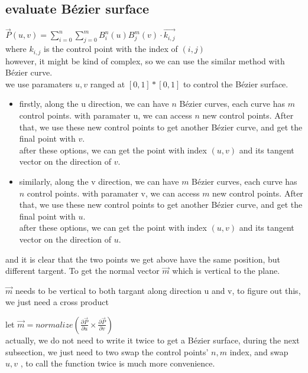 \documentclass[acmtog]{acmart}
\begin{document}
\subsection{evaluate Bézier surface}
$\vec{P}(u,v)=\sum_{i=0}^n\sum_{j=0}^mB_i^n(u)B_j^m(v)\cdot\vec{k_{i,j}}$\\
where $k_{i,j}$ is the control point with the index of $(i,j)$\\
however, it might be kind of complex, so we can use the similar method with Bézier curve.\\
we use paramaters $u,v$ ranged at $[0,1]*[0,1]$ to control the Bézier surface.\\
\begin{itemize}
\item firstly, along the u direction, we can have $n$ Bézier curves, each curve has $m$ control points.
with paramater u, we can access $n$ new control points.
After that, we use these new control points to get another Bézier curve, and get the 
final point with $v$.\\
after these options, we can get the point with index $(u,v)$ and its tangent vector on the direction of $v$.\\

\item similarly, along the v direction, we can have $m$ Bézier curves, each curve has $n$ control points.
with paramater v, we can access $m$ new control points.
After that, we use these new control points to get another Bézier curve, and get the 
final point with $u$.\\
after these options, we can get the point with index $(u,v)$ and its tangent vector on the direction of $u$.\\

\end{itemize}

and it is clear that the two points we get above have the same position, but 
different targent. To get the normal vector $\vec{m}$ which is vertical to the plane.

$\vec{m}$ needs to be vertical to both targant along direction u and v,
to figure out this, we just need a cross product

let $\vec{m}=normalize(\frac{\partial \vec{P}}{\partial u} \times \frac{\partial \vec{P}}{\partial v})$\\
actually, we do not need to write it twice to get a Bézier surface, during the next subsection, 
we just need to two swap the control points' $n,m$ index, and swap $u,v$ , to call the function twice is 
much more convenience.
\end{document}
